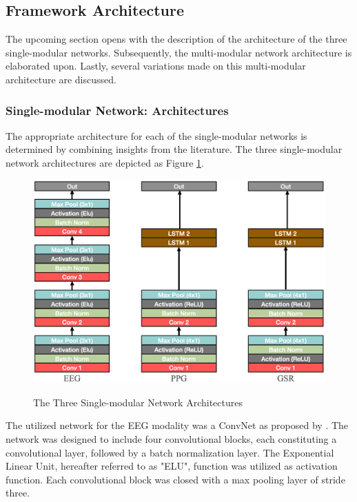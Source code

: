 \documentclass[12pt]{article}
\begin{document}
\subsection{Framework Architecture}
The upcoming section opens with the description of the architecture of the three single-modular networks. Subsequently, the multi-modular network architecture is elaborated upon. Lastly, several variations made on this multi-modular architecture are discussed. 

\subsubsection{Single-modular Network: Architectures}
The appropriate architecture for each of the single-modular networks is determined by combining insights from the literature. The three single-modular network architectures are depicted as Figure \ref{fig:singlearchitecture}.

\begin{figure}
\caption{The Three Single-modular Network Architectures}
\bigskip
\includegraphics[scale=0.725]{single_model_architecture}
\label{fig:singlearchitecture}
\end{figure}

The utilized network for the EEG modality was a ConvNet as proposed by . The network was designed to include four convolutional blocks, each constituting a convolutional layer, followed by a batch normalization layer. The Exponential Linear Unit, hereafter referred to as "ELU", function was utilized as activation function. Each convolutional block was closed with a max pooling layer of stride three.
\end{document}
